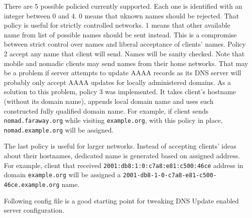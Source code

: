 There are 5 possible policied currently supported. Each one is
identified with an integer between 0 and 4. 0 means that uknown names
should be rejected. That policy is useful for strictly controlled
networks. 1 means that other available name from list of possible
names should be sent instead. This is a compromise between strict
control over names and liberal acceptance of clients' names. Policy 2
accept any name that client will send. Names will be sanity
checked. Note that mobile and nomadic clients may send names from
their home networks. That may be a problem if server attempts to
update AAAA records as its DNS server will probably only accept AAAA
updates for locally administered domains. As a solution to this
problem, policy 3 was implemented. It takes client's hostname (without
its domain name), appends local domain name and uses such constructed
fully qualified domain name. For example, if client
sends \verb+nomad.faraway.org+ while visiting \verb+example.org+, with
this policy in place, \verb+nomad.example.org+ will be assigned.

The last policy is useful for larger networks. Instead of accepting
clients' ideas about their hostnames, dedicated name is generated
based on assigned address. For example, client that received
\verb+2001:db8:1:0:c7a8:e81:c500:46ce+ address in domain
\verb+example.org+ will be assigned
a \verb+2001-db8-1-0-c7a8-e81-c500-46ce.example.org+ name.

Following config file is a good starting point for tweaking DNS
Update enabled server configuration.

